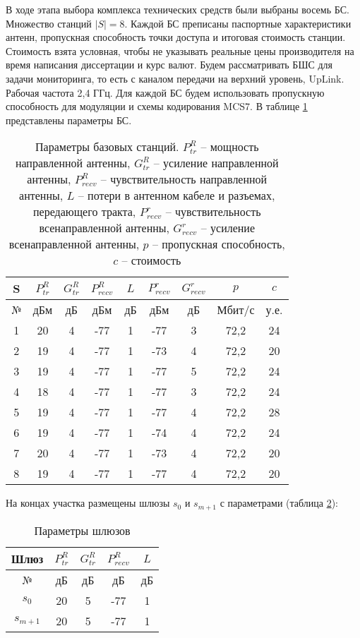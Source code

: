 В ходе этапа выбора комплекса технических средств были выбраны восемь БС. Множество станций $|S| = 8$. Каждой БС преписаны паспортные характеристики антенн, пропускная способность точки доступа и итоговая стоимость станции. Стоимость взята условная, чтобы не указывать реальные цены производителя на время написания диссертации и курс валют. Будем рассматривать БШС для задачи мониторинга, то есть с каналом передачи на верхний уровень, UpLink. Рабочая частота 2,4 ГГц. Для каждой БС будем использовать пропускную способность для модуляции и схемы кодирования MCS7.  В таблице \cref{tab:sta_parameters} представлены параметры БС.

\begin{table}[h!]\centering
  \begin{tabular}{|c||c|c|c|c|c|c|c|c|}\hline
      
      S&	$P_{tr}^R$&	$G_{tr}^R$&	$P_{recv}^R$&	$L$&	$P_{recv}^r$&	$G_{recv}^r$&	$p$&	$c$ \\
      \hline
      №&	дБм&	дБ&	дБм&	дБ&	дБм&	дБ&	Мбит/с&	у.е. \\
      \hline
      1&	20&	4&	-77&	1&	-77&	3&	72,2& 24 \\
      2&	19&	4&	-77&	1&	-73&	4&	72,2&	20 \\
      3&	19&	4&	-77&	1&	-77&	5&	72,2&	24 \\
      4&	18&	4&	-77&	1&	-77&	3&	72,2&	24 \\
      5&	19&	4&	-77&	1&	-77&	4&	72,2&	28 \\
      6&	19&	4&	-77&	1&	-74&	4&	72,2&	24 \\
      7&	20&	4&	-77&	1&	-73&	4&	72,2&	20 \\
      8&	19&	4&	-77&	1&	-77&	4&	72,2&	20 \\
      \hline

\end{tabular}\caption{Параметры базовых станций. $P_{tr}^{R}$ -- мощность направленной антенны, $G_{tr}^R$ -- усиление направленной антенны, $P_{recv}^R$ -- чувствительность направленной антенны, $L$  -- потери в антенном кабеле и разъемах, передающего тракта, $P_{recv}^r$ -- чувствительность всенаправленной антенны, $G_{recv}^r$ -- усиление всенаправленной антенны,  $p$ – пропускная способность, $c$ – стоимость}\label{tab:sta_parameters}
\end{table}

На концах участка размещены шлюзы $s_0 $ и $s_{m+1}$ с параметрами (таблица \cref{tab:app_gateway_parameters}):

\begin{table}[h!]\centering
  \begin{tabular}{|c||c|c|c|c|}\hline
      
      Шлюз&	$P_{tr}^R$&	$G_{tr}^R$&	$P_{recv}^R$&	$L$ \\
      \hline
      №&	дБ&	дБ&	дБ&	дБ \\
      \hline
      $s_0 $&	20&	5&	-77&	1 \\
      $s_{m+1}$&	20&	5&	-77&	1 \\
      \hline

\end{tabular}\caption{Параметры шлюзов}\label{tab:app_gateway_parameters}
\end{table}

